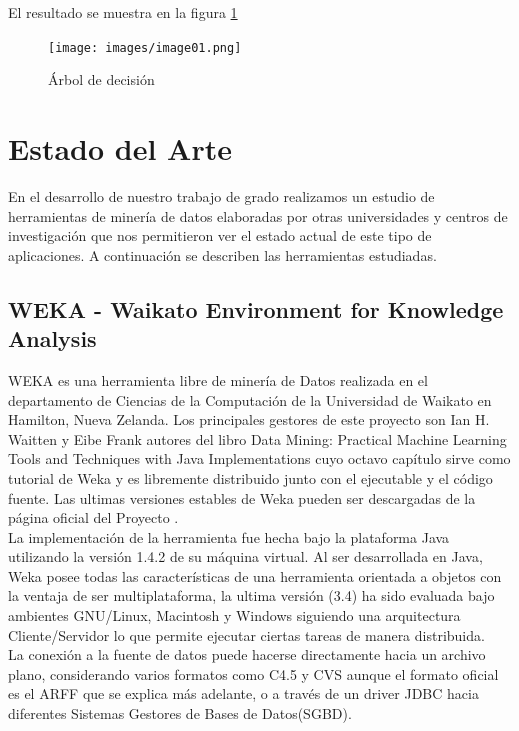 El resultado se muestra en la figura \ref{t4}

\begin{figure}[ht]
\centering
\texttt{[image: images/image01.png]}
\caption{\'Arbol de decisi\'on}
\label{t4}
\end{figure}

\newpage
\section{Estado del Arte}
En el desarrollo de nuestro trabajo de grado realizamos un estudio de herramientas de miner\'ia de datos
elaboradas por otras universidades y centros de investigaci\'on que nos permitieron ver el estado actual de este
tipo de aplicaciones. A continuaci\'on se describen las herramientas estudiadas.

\subsection{WEKA - Waikato Environment for Knowledge Analysis}
WEKA es una herramienta libre de miner\'ia de Datos realizada en el departamento de Ciencias de la Computaci\'on
de la Universidad de Waikato en Hamilton, Nueva Zelanda.  Los principales gestores de este proyecto son Ian H.
Waitten y Eibe Frank autores del libro Data Mining: Practical Machine Learning Tools and Techniques with Java
Implementations \cite{37} cuyo octavo cap\'itulo sirve como tutorial de Weka y es libremente distribuido junto con
el ejecutable y el c\'odigo fuente.  Las ultimas versiones estables de Weka pueden ser descargadas de la p\'agina
oficial del Proyecto \cite{38}.\\

La implementaci\'on de la herramienta fue hecha bajo la plataforma Java utilizando la versi\'on 1.4.2 de su
m\'aquina virtual.  Al ser desarrollada en Java, Weka posee todas las caracter\'isticas de una herramienta
orientada a objetos con la ventaja de ser multiplataforma, la ultima versi\'on (3.4) ha sido evaluada bajo
ambientes GNU/Linux, Macintosh y Windows siguiendo una arquitectura Cliente/Servidor lo que permite ejecutar
ciertas tareas de mane\-ra distribuida.\\

La conexi\'on a la fuente de datos puede hacerse directamente hacia un archivo plano, considerando varios formatos
como C4.5 y CVS aunque el formato oficial es el ARFF que se explica m\'as adelante, o a trav\'es de un driver JDBC
hacia diferentes Sistemas Gestores de Bases de Datos(SGBD).\\

